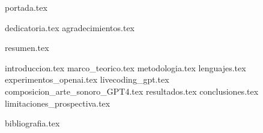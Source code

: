 


  {portada.tex}
  \setcounter{page}{2} %

  \pagecolor{yellow!30}
  \todototoc
  \clearpage
  \nopagecolor

  \clearpage

  \thispagestyle{empty} 
  {dedicatoria.tex}
  \clearpage
  \thispagestyle{empty} 
  {agradecimientos.tex}
  \thispagestyle{empty} 
  \clearpage
  \thispagestyle{empty} %
  
  \pagestyle{fancy} 

  {resumen.tex}
  \clearpage
  

  \tableofcontents
  \clearpage

  \listoffigures 
  \clearpage

  \listoftables
  \clearpage

  \label{chap:glosario}
  \printglossary[title=Índice de acrónimos, toctitle=Índice de acrónimos]
  \clearpage

  \setcounter{inicioContenido}{\value{page}}

  {introduccion.tex}
  {marco_teorico.tex}
  {metodologia.tex}
  {lenguajes.tex}
  {experimentos_openai.tex}
  {livecoding_gpt.tex}
  {composicion_arte_sonoro_GPT4.tex}
  {resultados.tex}
  {conclusiones.tex}
  {limitaciones_prospectiva.tex}

  \setcounter{finContenido}{\value{page}}

  {bibliografia.tex}
  \setcounter{antesAnexos}{\value{page}}
  \clearpage


